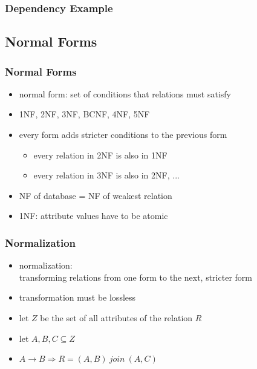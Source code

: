 \documentclass[dvipsnames]{beamer}
\begin{document}
\begin{frame}
  \frametitle{Dependency Example}

  \begin{center}
  \end{center}
\end{frame}

\subsection{Normal Forms}

\begin{frame}
  \frametitle{Normal Forms}

  \begin{itemize}
    \item \alert{normal form}: set of conditions that relations must satisfy

    \medskip
    \item 1NF, 2NF, 3NF, BCNF, 4NF, 5NF
    \item every form adds stricter conditions to the previous form
    \begin{itemize}
      \item every relation in 2NF is also in 1NF
      \item every relation in 3NF is also in 2NF, ...
    \end{itemize}
    \item NF of database = NF of weakest relation

    \pause
    \medskip
    \item \alert{1NF}: attribute values have to be atomic
  \end{itemize}
\end{frame}

\begin{frame}
  \frametitle{Normalization}

  \begin{itemize}
    \item \alert{normalization}:\\
      transforming relations from one form to the next, stricter form

    \item transformation must be lossless
  \end{itemize}

  \pause
  \begin{theorem}[Heath]
    \begin{itemize}
      \item let $Z$ be the set of all attributes of the relation $R$
      \item let $A,B,C \subseteq Z$

      \medskip
      \item $A \rightarrow B \Rightarrow R = (A,B) ~join~ (A,C)$
    \end{itemize}
  \end{theorem}
\end{frame}
\end{document}
